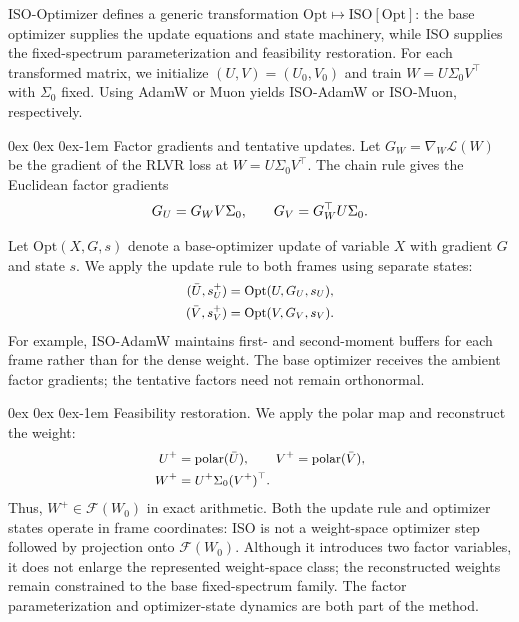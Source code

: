 \documentclass[11pt, a4paper]{utda}
\makeatletter
\renewcommand{\paragraph}{%
  \@startsection{paragraph}{4}%
  {\z@}{0ex \@plus 0ex \@minus 0ex}{-1em}%
  {\normalfont\normalsize\bfseries}%
}
\theoremstyle{plain}
\theoremstyle{definition}
\theoremstyle{remark}
\makeatother
\begin{document}
ISO-Optimizer defines a generic transformation
$\mathrm{Opt}\mapsto\mathrm{ISO}[\mathrm{Opt}]$:
the base optimizer supplies the update equations and state
machinery, while ISO supplies the fixed-spectrum parameterization
and feasibility restoration.
For each transformed matrix, we initialize
$(U,V)=(U_0,V_0)$ and train $W=U\Sigma_0V^\top$ with
$\Sigma_0$ fixed.
Using AdamW or Muon yields ISO-AdamW or ISO-Muon, respectively.

\paragraph{Factor gradients and tentative updates.}
Let $G_W=\nabla_W\mathcal L(W)$ be the gradient of the RLVR loss
at $W=U\Sigma_0V^\top$.
The chain rule gives the Euclidean factor gradients
\begin{equation}
\small
\label{eq:iso_factor_gradients}
    G_U=G_WV\Sigma_0,
    \qquad
    G_V=G_W^\top U\Sigma_0.
\end{equation}

Let $\mathrm{Opt}(X,G,s)$ denote a base-optimizer update of
variable $X$ with gradient $G$ and state $s$.
We apply the update rule to both frames using separate states:
\begin{equation}
\small
\label{eq:iso_optimizer_updates}
\begin{aligned}
    (\bar U,s_U^+)&=\mathrm{Opt}(U,G_U,s_U),\\
    (\bar V,s_V^+)&=\mathrm{Opt}(V,G_V,s_V).
\end{aligned}
\end{equation}
For example, ISO-AdamW maintains first- and second-moment
buffers for each frame rather than for the dense weight.
The base optimizer receives the ambient factor gradients;
the tentative factors need not remain orthonormal.

\paragraph{Feasibility restoration.}
We apply the polar map and reconstruct the weight:
\begin{equation}
\small
\label{eq:iso_optimizer_reconstruction}
\begin{aligned}
    U^+&=\operatorname{polar}(\bar U),
    \qquad
    V^+=\operatorname{polar}(\bar V),\\
    W^+&=U^+\Sigma_0(V^+)^\top.
\end{aligned}
\end{equation}
Thus, $W^+\in\mathcal F(W_0)$ in exact arithmetic.
Both the update rule and optimizer states operate in frame
coordinates: ISO is not a weight-space optimizer step followed
by projection onto $\mathcal F(W_0)$.
Although it introduces two factor variables, it does not enlarge
the represented weight-space class; the reconstructed weights
remain constrained to the base fixed-spectrum family.
The factor parameterization and optimizer-state dynamics are
both part of the method.
\end{document}

